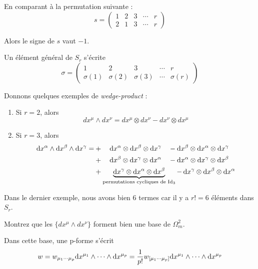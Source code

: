 En comparant à la permutation suivante :
\begin{equation*}
    s = 
    \begin{pmatrix}
        1 & 2 & 3 & \cdots & r \\
        2 & 1 & 3 & \cdots & r 
    \end{pmatrix}
\end{equation*}

Alors le signe de $s$ vaut $-1$.

Un élément général de $S_r$ s'écrite 
\begin{equation*}
\sigma = \begin{pmatrix}
1 & 2 & 3 & \cdots & r \\
\sigma(1) & \sigma(2) & \sigma(3) & \cdots & \sigma(r) 
\end{pmatrix}
\end{equation*}

\begin{exmp}
    Donnons quelques exemples de \emph{wedge-product} :
    \begin{enumerate}
        \item Si $r=2$, alors
        \begin{equation}
            dx^{\mu}\wedge dx^{\nu} = dx^{\mu}\otimes dx^{\nu} - dx^{\nu}\otimes dx^{\mu}
        \end{equation}
        \item Si $r=3$, alors
        \begin{align*}
            \mathrm{d} x^{\alpha}\wedge \mathrm{d} x^{\beta}\wedge \mathrm{d} x^{\gamma} =&+\quad \mathrm{d} x^{\alpha}\otimes \mathrm{d} x^{\beta}\otimes \mathrm{d} x^{\gamma} \quad - \mathrm{d} x^{\beta}\otimes\mathrm{d} x^{\alpha}\otimes \mathrm{d} x^{\gamma}\\
            &+ \quad \mathrm{d} x^{\beta}\otimes \mathrm{d} x^{\gamma}\otimes \mathrm{d} x^{\alpha} \quad - \mathrm{d} x^{\alpha}\otimes \mathrm{d} x^{\gamma}\otimes \mathrm{d} x^{\beta} \\
            &+\underbrace{
            \mathrm{d} x^{\gamma}\otimes \mathrm{d} x^{\alpha}\otimes \mathrm{d} x^{\beta}}_{\text{permutations cycliques de $\mathrm{Id}_3$}} -\,
            \mathrm{d} x^{\gamma}\otimes \mathrm{d} x^{\beta}\otimes \mathrm{d} x^{\alpha}
\end{align*}
    \end{enumerate}
\end{exmp}
Dans le dernier exemple, nous avons bien 6 termes car il y a $r! = 6$ éléments dans $S_r$.
\begin{exerc}
    Montrez que les $\{ dx^{\mu}\wedge dx^{\nu} \}$ forment bien une base de $\Omega_m^2$.
\end{exerc}
Dans cette base, une p-forme s'écrit
\begin{equation}
    w = w_{\mu_1 \cdots \mu_p}\mathrm{d} x^{\mu_1}\wedge \cdots \wedge \mathrm{d} x^{\mu_p} =\frac{1}{p!}w_{[\mu_1 \cdots \mu_p]}\mathrm{d} x^{\mu_1}\wedge \cdots \wedge \mathrm{d} x^{\mu_p}
\end{equation}

